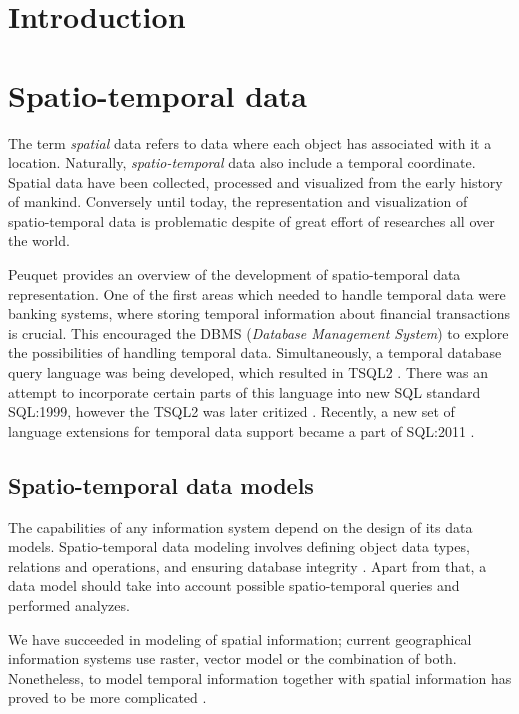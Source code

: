 \documentclass[a4paper,12pt]{book}
\title{}
\author{Anna Kratochvílová}
\begin{document}
\tableofcontents

\chapter{Introduction}
\chapter{Spatio-temporal data}
The term \emph{spatial} data refers to data where each object has associated with it a location.
Naturally, \emph{spatio-temporal} data also include a temporal coordinate.
Spatial data have been collected, processed and visualized from the early history of mankind.
Conversely until today, the representation and visualization of spatio-temporal data
is problematic despite of great effort of researches all over the world.

Peuquet \cite{peuquet2001} provides an overview of the development of spatio-temporal data representation.
One of the first areas which needed to handle temporal data were banking systems,
where storing temporal information about financial transactions is crucial.
This encouraged the DBMS (\emph{Database Management System}) to explore the possibilities of handling
temporal data. Simultaneously, a temporal database query language was being developed, which resulted in TSQL2 \cite{snodgrass1995}.
There was an attempt to incorporate certain parts of this language into new SQL standard SQL:1999,
however the TSQL2 was later critized \cite{darwen2005}.
Recently, a new set of language extensions for temporal data support became a part of
SQL:2011 \cite{kulkarni2012}.


\section{Spatio-temporal data models}
The capabilities of any information system depend on the design of its data models.
Spatio-temporal data modeling involves defining object data types,
relations and operations, and ensuring database integrity \cite{pelekis2004}.
Apart from that, a data model should take into account possible spatio-temporal queries and performed analyzes.

We have succeeded in modeling of spatial information;
current geographical information systems use raster, vector model or the combination of both.
Nonetheless, to model temporal information together with spatial information
has proved to be more complicated \cite{peuquet2001}.
\end{document}
